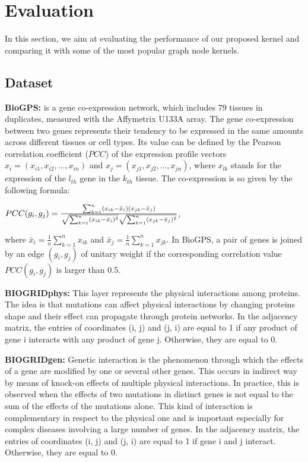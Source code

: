 \documentclass{esannV2}
\begin{document}
\section{Evaluation}\label{evaluation}
In this section, we aim at evaluating the performance of our proposed kernel and comparing it with some of the most popular graph node kernels.
\subsection{Dataset}
\textbf{BioGPS:} is a gene co-expression network, which includes 79 tissues in duplicates, measured with the Affymetrix U133A array. The gene co-expression between two genes represents their tendency to be expressed in the same amounts across different tissues or cell types. Its value can be defined by the Pearson correlation coefficient ($\textit{PCC}$) of the expression profile vectors 
$x_{i} = (x_{i1}, x_{i2},\dots, x_{in})$ and $x_{j} = (x_{j1}, x_{j2},\dots, x_{jn})$, where $x_{lk}$ stands for the expression of the $l_{th}$ gene in the $k_{th}$ tissue. The co-expression is so given by the following formula:
\begin{center}
$PCC(g_i,g_j)=\frac{\sum_{k=1}^n (x_{ik}-\bar{x}_i)(x_{jk}-\bar{x}_j)}{\sqrt{\sum_{k=1}^n (x_{ik}-\bar{x}_i)^2\vphantom{x_j}}\sqrt{\sum_{k=1}^n (x_{jk}-\bar{x}_j)^2}}$,
\end{center}
where $\bar{x}_i=\frac{1}{n}\sum_{k=1}^n x_{ik}$ and $\bar{x}_j=\frac{1}{n}\sum_{k=1}^n x_{jk}$. In BioGPS, a pair of genes is joined by an edge $(g_{i}, g_{j})$ of unitary weight if the corresponding correlation value $PCC(g_{i},g_{j})$ is larger than 0.5.

\textbf{BIOGRIDphys:} This layer represents the physical interactions among proteins. The idea is that mutations can affect physical interactions by changing proteins shape and their effect can propagate through
protein networks. In the adjacency matrix, the entries of coordinates (i, j) and (j, i) are equal to 1 if any product of gene i interacts with any product of gene j. Otherwise, they are equal to 0.

\textbf{BIOGRIDgen:} Genetic interaction is the phenomenon through which the effects of a gene are modified by one or several other genes. This occurs in indirect way by means of knock-on effects of multiple physical
interactions. In practice, this is observed when the effects of two mutations in distinct genes is not equal to the sum of the effects of the mutations alone. This kind of interaction is complementary in respect
to the physical one and is important especially for complex diseases involving a large number of genes. In the adjacency matrix, the entries of coordinates (i, j) and (j, i) are equal to 1 if gene i and j interact.
Otherwise, they are equal to 0.
\end{document}
